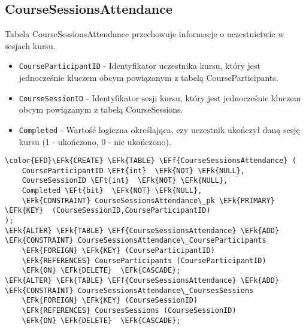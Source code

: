 \documentclass[11pt]{article}
\newcommand{\EFk}[1]{\textcolor{EFk}{\textbf{#1}}} %
\newcommand{\EFf}[1]{\textcolor{EFf}{#1}} %
\newcommand{\EFt}[1]{\textcolor{EFt}{\textbf{#1}}} %
\begin{document}
\subsection{CourseSessionsAttendance}
\label{sec:org3652f5a}
Tabela CourseSessionsAttendance przechowuje informacje o uczestnictwie w sesjach kursu.
\begin{itemize}
\item \texttt{CourseParticipantID} - Identyfikator uczestnika kursu, który jest jednocześnie kluczem obcym powiązanym z tabelą CourseParticipants.
\item \texttt{CourseSessionID} - Identyfikator sesji kursu, który jest jednocześnie kluczem obcym powiązanym z tabelą CourseSessions.
\item \texttt{Completed} - Wartość logiczna określająca, czy uczestnik ukończył daną sesję kursu (1 - ukończono, 0 - nie ukończono).
\end{itemize}
\begin{Code}
\begin{Verbatim}
\color{EFD}\EFk{CREATE} \EFk{TABLE} \EFf{CourseSessionsAttendance} (
    CourseParticipantID \EFt{int}  \EFk{NOT} \EFk{NULL},
    CourseSessionID \EFt{int}  \EFk{NOT} \EFk{NULL},
    Completed \EFt{bit}  \EFk{NOT} \EFk{NULL},
    \EFk{CONSTRAINT} CourseSessionsAttendance\_pk \EFk{PRIMARY} \EFk{KEY}  (CourseSessionID,CourseParticipantID)
);
\EFk{ALTER} \EFk{TABLE} \EFf{CourseSessionsAttendance} \EFk{ADD} \EFk{CONSTRAINT} CourseSessionsAttendance\_CourseParticipants
    \EFk{FOREIGN} \EFk{KEY} (CourseParticipantID)
    \EFk{REFERENCES} CourseParticipants (CourseParticipantID)
    \EFk{ON} \EFk{DELETE}  \EFk{CASCADE};
\EFk{ALTER} \EFk{TABLE} \EFf{CourseSessionsAttendance} \EFk{ADD} \EFk{CONSTRAINT} CourseSessionsAttendance\_CoursesSessions
    \EFk{FOREIGN} \EFk{KEY} (CourseSessionID)
    \EFk{REFERENCES} CoursesSessions (CourseSessionID)
    \EFk{ON} \EFk{DELETE}  \EFk{CASCADE};
\end{Verbatim}
\end{Code}
\end{document}
